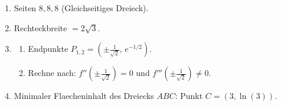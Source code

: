 \clearpage

\begin{enumerate}
	\item Seiten \(8,8,8\) (Gleichseitiges Dreieck).

	\item Rechteckbreite \(=2\sqrt{3}\).



	\item
	      \begin{enumerate}
		      \item Endpunkte \( P_{1,2} = (\pm \tfrac{1}{\sqrt{2}},\, e^{-1/2}) \).
		      \item Rechne nach: $f''(\pm \tfrac{1}{\sqrt{2}}) = 0$ und $f'''(\pm \tfrac{1}{\sqrt{2}}) \neq 0$.
	      \end{enumerate}
	\item Minimaler Flaecheninhalt des Dreiecks \(ABC\): Punkt \(C=(3,\ln(3))\).
\end{enumerate}

\clearpage

